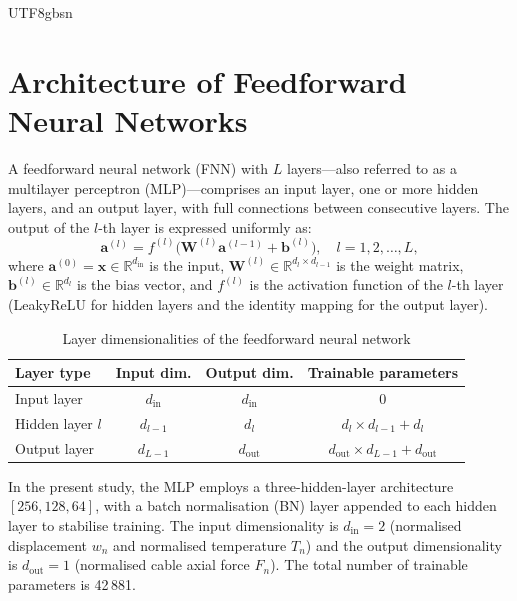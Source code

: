 \documentclass[a4paper,12pt]{report}
\begin{document}
\begin{CJK}{UTF8}{gbsn}
\section{Architecture of Feedforward Neural Networks}
\label{sec:ffnn_arch}

A feedforward neural network (FNN) with $L$ layers---also referred to as a multilayer
perceptron (MLP)---comprises an input layer, one or more hidden layers, and an output
layer, with full connections between consecutive layers. The output of the $l$-th layer
is expressed uniformly as:
\begin{equation}
  \mathbf{a}^{(l)} = f^{(l)}\!\bigl(\mathbf{W}^{(l)}\mathbf{a}^{(l-1)} + \mathbf{b}^{(l)}\bigr),
  \quad l = 1,2,\ldots,L,
  \label{eq:ffnn_layer}
\end{equation}
where $\mathbf{a}^{(0)} = \mathbf{x} \in \mathbb{R}^{d_{\text{in}}}$ is the input,
$\mathbf{W}^{(l)} \in \mathbb{R}^{d_l \times d_{l-1}}$ is the weight matrix,
$\mathbf{b}^{(l)} \in \mathbb{R}^{d_l}$ is the bias vector, and $f^{(l)}$ is the
activation function of the $l$-th layer (LeakyReLU for hidden layers and the identity
mapping for the output layer).

\begin{table}[H]
  \centering
  \caption{Layer dimensionalities of the feedforward neural network}
  \label{tab:ffnn_dims}
  \begin{tabular}{lccc}
    \toprule
    \textbf{Layer type} & \textbf{Input dim.} & \textbf{Output dim.} & \textbf{Trainable parameters} \\
    \midrule
    Input layer & $d_{\text{in}}$ & $d_{\text{in}}$ & 0 \\
    Hidden layer $l$ & $d_{l-1}$ & $d_l$ & $d_l \times d_{l-1} + d_l$ \\
    Output layer & $d_{L-1}$ & $d_{\text{out}}$ & $d_{\text{out}} \times d_{L-1} + d_{\text{out}}$ \\
    \bottomrule
  \end{tabular}
\end{table}

In the present study, the MLP employs a three-hidden-layer architecture $[256,128,64]$,
with a batch normalisation (BN) layer appended to each hidden layer to stabilise training.
The input dimensionality is $d_{\text{in}} = 2$ (normalised displacement $w_n$ and
normalised temperature $T_n$) and the output dimensionality is $d_{\text{out}} = 1$
(normalised cable axial force $F_n$). The total number of trainable parameters is 42\,881.


\end{CJK}
\end{document}
